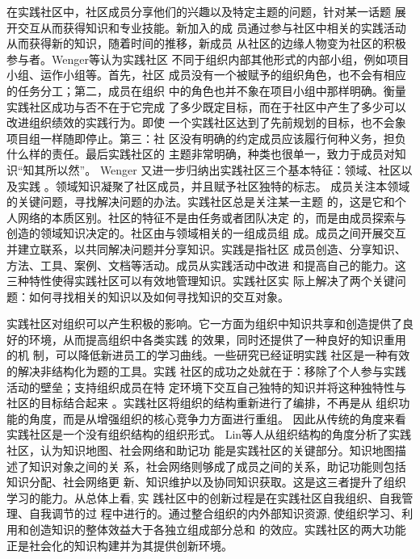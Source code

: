 在实践社区中，社区成员分享他们的兴趣以及特定主题的问题，针对某一话题
展开交互从而获得知识和专业技能\cite{Wenger2002}。新加入的成
员通过参与社区中相关的实践活动从而获得新的知识，随着时间的推移，新成员
从社区的边缘人物变为社区的积极参与者。Wenger等认为实践社区
不同于组织内部其他形式的内部小组，例如项目小组、运作小组等。首先，社区
成员没有一个被赋予的组织角色，也不会有相应的任务分工；第二，成员在组织
中的角色也并不象在项目小组中那样明确。衡量实践社区成功与否不在于它完成
了多少既定目标，而在于社区中产生了多少可以改进组织绩效的实践行为。即使
一个实践社区达到了先前规划的目标，也不会象项目组一样随即停止。第三：社
区没有明确的约定成员应该履行何种义务，担负什么样的责任。最后实践社区的
主题非常明确，种类也很单一，致力于成员对知识“知其所以然”。
Wenger 又进一步归纳出实践社区三个基本特征：领域、社区以及实践
\cite{wenger2004kmd}。领域知识凝聚了社区成员，并且赋予社区独特的标志。
成员关注本领域的关键问题，寻找解决问题的办法。实践社区总是关注某一主题
的，这是它和个人网络的本质区别。社区的特征不是由任务或者团队决定
的，而是由成员探索与创造的领域知识决定的。社区由与领域相关的一组成员组
成。成员之间开展交互并建立联系，以共同解决问题并分享知识。实践是指社区
成员创造、分享知识、方法、工具、案例、文档等活动。成员从实践活动中改进
和提高自己的能力。这三种特性使得实践社区可以有效地管理知识。实践社区实
际上解决了两个关键问题：如何寻找相关的知识以及如何寻找知识的交互对象\cite{Yang2008}。

实践社区对组织可以产生积极的影响。它一方面为组织中知识共享和创造提供了良好的环境，从而提高组织中各类实践
的效果\cite{lesser2001ucp}，同时还提供了一种良好的知识重用的机
制，可以降低新进员工的学习曲线\cite{dube2005isc}。一些研究已经证明实践
社区是一种有效的解决非结构化为题的工具\cite{vonwartburg2004csa}。实践
社区的成功之处就在于：移除了个人参与实践活动的壁垒；支持组织成员在特
定环境下交互自己独特的知识并将这种独特性与社区的目标结合起来
\cite{ardichvili2003mab}。实践社区将组织的结构重新进行了编排，不再是从
组织功能的角度，而是从增强组织的核心竞争力方面进行重组\cite{Pan2003}。
因此从传统的角度来看实践社区是一个没有组织结构的组织形式\cite{lesser2001cpa}。
Lin等人从组织结构的角度分析了实践社区，认为知识地图、社会网络和助记功
能是实践社区的关键部分\cite{lin2001cmv}。知识地图描述了知识对象之间的关
系，社会网络则够成了成员之间的关系，助记功能则包括知识分配、社会网络更
新、知识维护以及协同知识获取。这是这三者提升了组织学习的能力。从总体上看, 实
践社区中的创新过程是在实践社区自我组织、自我管理、自我调节的过
程中进行的。通过整合组织的内外部知识资源, 使组织学习、利
用和创造知识的整体效益大于各独立组成部分总和
的效应。实践社区的两大功能正是社会化的知识构建并为其提供创新环境。

